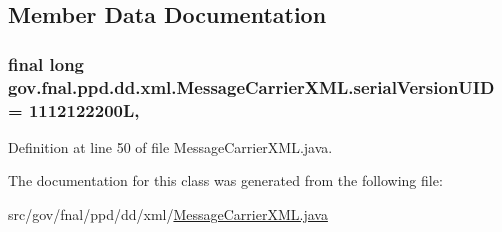 \subsection{Member Data Documentation}
\hypertarget{classgov_1_1fnal_1_1ppd_1_1dd_1_1xml_1_1MessageCarrierXML_addbf53e6678de784e9f2f7a4804c48cf}{
\subsubsection[{serial\-Version\-U\-I\-D}]{\setlength{\rightskip}{0pt plus 5cm}final long gov.\-fnal.\-ppd.\-dd.\-xml.\-Message\-Carrier\-X\-M\-L.\-serial\-Version\-U\-I\-D = 1112122200\-L\hspace{0.3cm}{\ttfamily [static]}, {\ttfamily [protected]}}}\label{classgov_1_1fnal_1_1ppd_1_1dd_1_1xml_1_1MessageCarrierXML_addbf53e6678de784e9f2f7a4804c48cf}


Definition at line 50 of file Message\-Carrier\-X\-M\-L.\-java.



The documentation for this class was generated from the following file\-:\begin{DoxyCompactItemize}
\item 
src/gov/fnal/ppd/dd/xml/\hyperlink{MessageCarrierXML_8java}{Message\-Carrier\-X\-M\-L.\-java}\end{DoxyCompactItemize}
